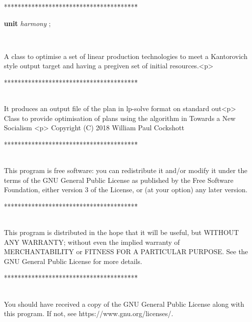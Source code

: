 \begin{tabbing}
***\=***\=***\=***\=***\=***\=***\=***\=***\=***\=***\=***\=***\=\kill
\parbox{14cm}{\textsf{\textbf{unit}  \textit{harmony} ;}}\\
\end{tabbing}
A class to optimise a set of linear production technologies to meet
a Kantorovich style output target and having a pregiven set of initial resources.<p>
\begin{tabbing}
***\=***\=***\=***\=***\=***\=***\=***\=***\=***\=***\=***\=***\=\kill
\\
\\
\end{tabbing}
It produces an output file of the plan in lp-solve format on standard out<p>
Class to provide optimisation of plans using the algorithm in Towards a New Socialism
<p>
Copyright (C) 2018 William Paul Cockshott
\begin{tabbing}
***\=***\=***\=***\=***\=***\=***\=***\=***\=***\=***\=***\=***\=\kill
\\
\\
\end{tabbing}
This program is free software: you can redistribute it and/or modify
it under the terms of the GNU General Public License as published by
the Free Software Foundation, either version 3 of the License, or
(at your option) any later version.
\begin{tabbing}
***\=***\=***\=***\=***\=***\=***\=***\=***\=***\=***\=***\=***\=\kill
\\
\\
\end{tabbing}
This program is distributed in the hope that it will be useful,
but WITHOUT ANY WARRANTY; without even the implied warranty of
MERCHANTABILITY or FITNESS FOR A PARTICULAR PURPOSE.  See the
GNU General Public License for more details.
\begin{tabbing}
***\=***\=***\=***\=***\=***\=***\=***\=***\=***\=***\=***\=***\=\kill
\\
\\
\end{tabbing}
You should have received a copy of the GNU General Public License
along with this program.  If not, see https://www.gnu.org/licenses/.
